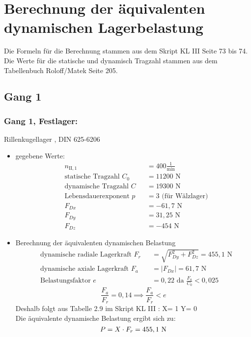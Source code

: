 \section{Berechnung der äquivalenten dynamischen Lagerbelastung}
Die Formeln für die Berechnung stammen aus dem Skript KL III Seite 73 bis 74.
Die Werte für die statische und dynamisch Tragzahl stammen aus dem Tabellenbuch Roloff/Matek  Seite 205.
\subsection{Gang 1}
\subsubsection{Gang 1, Festlager:} Rillenkugellager , DIN 625-6206\\
\begin{itemize}
	\item gegebene Werte:
	\begin{align*}
	&n_{{\mathord{\mathrm{II}},1}} &&=  400 \frac{1}{\text{min}} \\
	&\text{statische Tragzahl } C_{0} &&= 11200 \text{ N}\\
	&\text{dynamische Tragzahl } C &&= 19300 \text{ N} \\
	&\text{Lebensdauerexponent } p &&= 3 \text{ (für Wälzlager)} \\
	&F_{Dx} && = -61,7 \text{ N}\\
	&F_{Dy} && = 31,25 \text{ N}\\
	&F_{Dz} && = -454 \text{ N}
	\end{align*} 
	\item Berechnung der äquivalenten dynamischen Belastung
	\begin{align*}
	&\text{dynamische radiale Lagerkraft } F_r&& = \sqrt{F_{Dy}^2 + F_{Dz}^2 } = 455,1 \text{ N} \\
	&\text{dynamische axiale Lagerkraft } F_a&& = |F_{Dx}| = 61,7 \text{ N}\\
	&\text{Belastungsfaktor } e &&= 0,22 \text{ da } \frac{F_a}{C_0} < 0,025
	\end{align*} 
	\[\frac{F_a}{F_r} = 0,14 \implies \frac{F_a}{F_r} < e\]
	Deshalb folgt aus Tabelle 2.9 im Skript KL III : X= 1 \text{, } Y= 0 \\
	Die äquivalente dynamische Belastung ergibt sich zu: 
	\[
	P= X \cdot F_r = 455,1 \text{ N}
	\]
\end{itemize}

